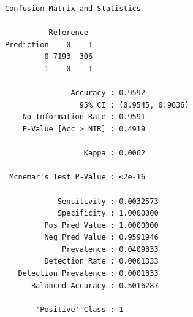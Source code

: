 \documentclass[
  letterpaper,
  DIV=11,
  numbers=noendperiod]{scrreprt}
\newenvironment{Shaded}{\begin{snugshade}}{\end{snugshade}}
\newcommand{\AttributeTok}[1]{\textcolor[rgb]{0.40,0.45,0.13}{#1}}
\newcommand{\CommentTok}[1]{\textcolor[rgb]{0.37,0.37,0.37}{#1}}
\newcommand{\DecValTok}[1]{\textcolor[rgb]{0.68,0.00,0.00}{#1}}
\newcommand{\FunctionTok}[1]{\textcolor[rgb]{0.28,0.35,0.67}{#1}}
\newcommand{\NormalTok}[1]{\textcolor[rgb]{0.00,0.23,0.31}{#1}}
\newcommand{\OtherTok}[1]{\textcolor[rgb]{0.00,0.23,0.31}{#1}}
\newcommand{\SpecialCharTok}[1]{\textcolor[rgb]{0.37,0.37,0.37}{#1}}
\newcommand{\StringTok}[1]{\textcolor[rgb]{0.13,0.47,0.30}{#1}}
\begin{document}
\begin{verbatim}
Confusion Matrix and Statistics

          Reference
Prediction    0    1
         0 7193  306
         1    0    1
                                          
               Accuracy : 0.9592          
                 95% CI : (0.9545, 0.9636)
    No Information Rate : 0.9591          
    P-Value [Acc > NIR] : 0.4919          
                                          
                  Kappa : 0.0062          
                                          
 Mcnemar's Test P-Value : <2e-16          
                                          
            Sensitivity : 0.0032573       
            Specificity : 1.0000000       
         Pos Pred Value : 1.0000000       
         Neg Pred Value : 0.9591946       
             Prevalence : 0.0409333       
         Detection Rate : 0.0001333       
   Detection Prevalence : 0.0001333       
      Balanced Accuracy : 0.5016287       
                                          
       'Positive' Class : 1               
                                          
\end{verbatim}

\begin{Shaded}
\end{Shaded}
\end{document}
